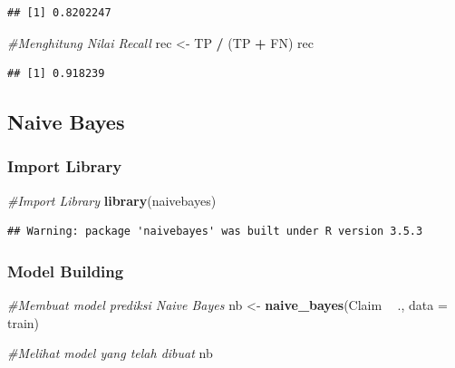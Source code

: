 \documentclass[]{article}
\newenvironment{Shaded}{\begin{snugshade}}{\end{snugshade}}
\newcommand{\CommentTok}[1]{\textcolor[rgb]{0.56,0.35,0.01}{\textit{#1}}}
\newcommand{\DataTypeTok}[1]{\textcolor[rgb]{0.13,0.29,0.53}{#1}}
\newcommand{\KeywordTok}[1]{\textcolor[rgb]{0.13,0.29,0.53}{\textbf{#1}}}
\newcommand{\NormalTok}[1]{#1}
\newcommand{\OperatorTok}[1]{\textcolor[rgb]{0.81,0.36,0.00}{\textbf{#1}}}
\newcommand{\StringTok}[1]{\textcolor[rgb]{0.31,0.60,0.02}{#1}}
\begin{document}
\begin{verbatim}
## [1] 0.8202247
\end{verbatim}

\begin{Shaded}
\begin{Highlighting}[]
\CommentTok{#Menghitung Nilai Recall}
\NormalTok{rec <-}\StringTok{ }\NormalTok{TP }\OperatorTok{/}\StringTok{ }\NormalTok{(TP }\OperatorTok{+}\StringTok{ }\NormalTok{FN)}
\NormalTok{rec}
\end{Highlighting}
\end{Shaded}

\begin{verbatim}
## [1] 0.918239
\end{verbatim}

\hypertarget{naive-bayes}{%
\subsection{Naive Bayes}\label{naive-bayes}}

\hypertarget{import-library-1}{%
\subsubsection{Import Library}\label{import-library-1}}

\begin{Shaded}
\begin{Highlighting}[]
\CommentTok{#Import Library}
\KeywordTok{library}\NormalTok{(naivebayes)}
\end{Highlighting}
\end{Shaded}

\begin{verbatim}
## Warning: package 'naivebayes' was built under R version 3.5.3
\end{verbatim}

\hypertarget{model-building-1}{%
\subsubsection{Model Building}\label{model-building-1}}

\begin{Shaded}
\begin{Highlighting}[]
\CommentTok{#Membuat model prediksi Naive Bayes}
\NormalTok{nb <-}\StringTok{ }\KeywordTok{naive_bayes}\NormalTok{(Claim }\OperatorTok{~}\StringTok{ }\NormalTok{., }\DataTypeTok{data =}\NormalTok{ train)}

\CommentTok{#Melihat model yang telah dibuat }
\NormalTok{nb}
\end{Highlighting}
\end{Shaded}
\end{document}
